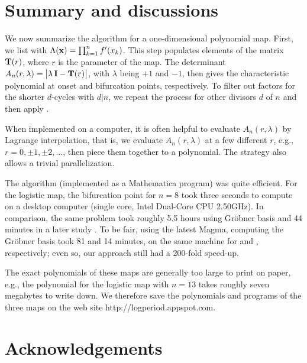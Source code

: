 \documentclass[twocolumn]{revtex4-1}
\begin{document}
\section{\label{sec:end}Summary and discussions}


We now summarize the algorithm for a one-dimensional polynomial map.
%
First, we list   with $\Lambda(\mathbf{x}) = \prod_{k=1}^n f'(x_k)$.
This step populates elements of the matrix $\mathbf{T}(r)$,
where $r$ is the parameter of the map.
%
The determinant $A_n(r, \lambda) = \big|\lambda \, \mathbf{I} - \mathbf{T}(r)\big|$,
with $\lambda$ being $+1$ and $-1$, then gives the characteristic
polynomial at onset and bifurcation points, respectively.
%
To filter out factors for the shorter $d$-cycles with $d|n$,
  we repeat the process for other divisors $d$ of $n$
  and then apply .
%


When implemented on a computer,
it is often helpful to evaluate $A_n(r,\lambda)$ by Lagrange interpolation,
that is, we evaluate $A_n(r, \lambda)$ at a few different $r$,
e.g., $r = 0, \pm1, \pm2,\ldots$, then piece them together
to a polynomial.
The strategy also allows a trivial parallelization.



The algorithm (implemented as a Mathematica program)
was quite efficient.
%
For the logistic map, the bifurcation point for $n = 8$
took three seconds to compute on a desktop computer
(single core, Intel\textsuperscript{\textregistered} Dual-Core CPU 2.50GHz).
%
In comparison,
  the same problem took roughly 5.5 hours \cite{kk1}
  using Gr\"obner basis
  and 44 minutes in a later study \cite{lewis}.
To be fair, using the latest Magma, computing the Gr\"obner basis
  took 81 and 14 minutes, on the same machine
  for  and , respectively;
even so, our approach still had a 200-fold speed-up.




%
The exact polynomials of these maps are generally too large to print on paper,
  e.g., the polynomial for the logistic map with $n = 13$
    takes roughly seven megabytes to write down.
%
We therefore save the polynomials and programs of the three maps on the web site
http://logperiod.appspot.com.




\section*{Acknowledgements}
\end{document}
